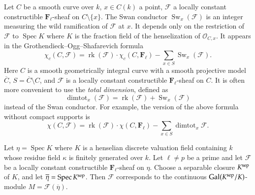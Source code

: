 \documentclass[twoside]{amsart}
\newcommand{\FF}{\mathbf{F}}
\newcommand{\Ff}{\mathscr{F}}
\newcommand{\Oo}{\mathscr{O}}
\DeclareMathOperator{\Spec}{Spec}
\DeclareMathOperator{\Swan}{Sw}
\DeclareMathOperator{\dimtot}{dimtot}
\DeclareMathOperator{\rk}{rk}
\renewcommand{\bar}{\overline}
\theoremstyle{plain}
\theoremstyle{definition}
\theoremstyle{remark}
\numberwithin{equation}{subsection}
\begin{document}
Let $C$ be a smooth curve over $k$, $x\in C(k)$ a point, $\Ff$ a locally constant constructible $\FF_\ell$-sheaf on $C\setminus\{x\}$. The Swan conductor $\Swan_x(\Ff)$ is an integer measuring the wild ramification of $\Ff$ at $x$. It depends only on the restriction of $\Ff$ to $\Spec K$ where $K$ is the fraction field of the henselization of $\Oo_{C, x}$. It appears in the Grothendieck--Ogg--Shafarevich formula \cite[Exp.~X, formula~7.2]{SGA5}
\begin{equation} \label{eqn:gos} 
	\chi_c(C, \Ff) = \rk(\Ff)\cdot\chi_c(C, \FF_\ell) - \sum_{x\in S} \Swan_{x}(\Ff). 
\end{equation}
Here $C$ is a smooth geometrically integral curve with a smooth projective model $\bar C$, $S = \bar C\setminus C$, and $\Ff$ is a locally constant constructible $\FF_\ell$-sheaf on $C$. It is often more convenient to use the \emph{total dimension}, defined as
\[ 
	\dimtot_x (\Ff) = \rk (\Ff) + \Swan_x (\Ff)
\]
instead of the Swan conductor. For example, the version of the above formula without compact supports is
\begin{equation} \label{eqn:gos-no-support} 
	\chi(C, \Ff) = \rk(\Ff)\cdot\chi(C, \FF_\ell) - \sum_{x\in S} \dimtot_x \Ff. 
\end{equation}

Let $\eta = \Spec K$ where $K$ is a henselian discrete valuation field containing $k$ whose residue field $\kappa$ is finitely generated over $k$. Let $\ell\neq p$ be a prime and let $\Ff$ be a locally constant constructible $\FF_\ell$-sheaf on $\eta$. Choose a separable closure $K^{\rm sep}$ of $K$, and let $\bar\eta = \Spec K^{\rm sep}$. Then $\Ff$ corresponds to the continuous ${\rm Gal}(K^{\rm sep}/K)$-module $M=\Ff(\bar\eta)$.
\end{document}
